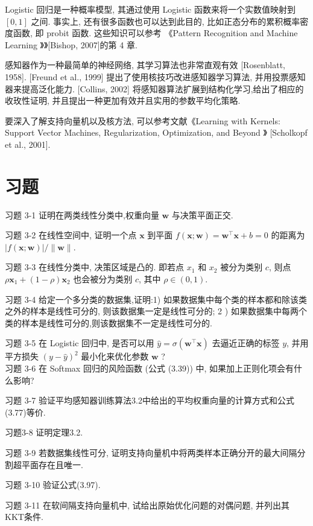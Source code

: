 \documentclass[10pt]{article}
\begin{document}
Logistic 回归是一种概率模型, 其通过使用 Logistic 函数来将一个实数值映射到 $[0,1]$ 之间. 事实上, 还有很多函数也可以达到此目的, 比如正态分布的累积概率密度函数, 即 probit 函数. 这些知识可以参考 《Pattern Recognition and Machine Learning 》》[Bishop, 2007]的第 4 章.

感知器作为一种最简单的神经网络, 其学习算法也非常直观有效 [Rosenblatt, 1958]. [Freund et al., 1999] 提出了使用核技巧改进感知器学习算法, 并用投票感知器来提高泛化能力. [Collins, 2002] 将感知器算法扩展到结构化学习,给出了相应的收玫性证明, 并且提出一种更加有效并且实用的参数平均化策略.

要深入了解支持向量机以及核方法, 可以参考文献《Learning with Kernels: Support Vector Machines, Regularization, Optimization, and Beyond 》 [Scholkopf et al., 2001].

\section*{习题}
习题 3-1 证明在两类线性分类中,权重向量 $\boldsymbol{w}$ 与决策平面正交.

习题 3-2 在线性空间中, 证明一个点 $\boldsymbol{x}$ 到平面 $f(\boldsymbol{x} ; \boldsymbol{w})=\boldsymbol{w}^{\top} \boldsymbol{x}+b=0$ 的距离为 $|f(\boldsymbol{x} ; \boldsymbol{w})| /\|\boldsymbol{w}\|$.

习题 3-3 在线性分类中, 决策区域是凸的. 即若点 $x_{1}$ 和 $x_{2}$ 被分为类别 $c$, 则点 $\rho \boldsymbol{x}_{1}+(1-\rho) \boldsymbol{x}_{2}$ 也会被分为类别 $c$, 其中 $\rho \in(0,1)$.

习题 3-4 给定一个多分类的数据集,证明:1) 如果数据集中每个类的样本都和除该类之外的样本是线性可分的, 则该数据集一定是线性可分的; 2 ) 如果数据集中每两个类的样本是线性可分的,则该数据集不一定是线性可分的.

习题 3-5 在 Logistic 回归中, 是否可以用 $\hat{y}=\sigma\left(\boldsymbol{w}^{\top} \boldsymbol{x}\right)$ 去逼近正确的标签 $y$, 并用平方损失 $(y-\hat{y})^{2}$ 最小化来优化参数 $\boldsymbol{w}$ ?\\
习题 3-6 在 Softmax 回归的风险函数 (公式 (3.39)) 中, 如果加上正则化项会有什么影响?

习题 3-7 验证平均感知器训练算法3.2中给出的平均权重向量的计算方式和公式 (3.77)等价.

习题3-8 证明定理3.2.

习题 3-9 若数据集线性可分, 证明支持向量机中将两类样本正确分开的最大间隔分割超平面存在且唯一.

习题 3-10 验证公式(3.97).

习题 3-11 在软间隔支持向量机中, 试给出原始优化问题的对偶问题, 并列出其 KKT条件.
\end{document}
